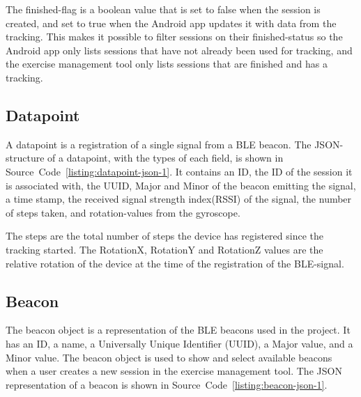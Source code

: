 \documentclass[../Main/thesis.tex]{subfiles}
\begin{document}
The finished-flag is a boolean value that is set to false when the session is created, and set to true when the Android app updates it with data from the tracking.
This makes it possible to filter sessions on their finished-status so the Android app only lists sessions that have not already been used for tracking, and the exercise management tool only lists sessions that are finished and has a tracking.

\subsection{Datapoint}
A datapoint is a registration of a single signal from a BLE beacon.
The JSON-structure of a datapoint, with the types of each field, is shown in Source~Code~\ref{listing:datapoint-json-1}.
It contains an ID, the ID of the session it is associated with, the UUID, Major and Minor of the beacon emitting the signal, a time stamp, the received signal strength index(RSSI) of the signal, the number of steps taken, and rotation-values from the gyroscope.


The steps are the total number of steps the device has registered since the tracking started. 
The RotationX, RotationY and RotationZ values are the relative rotation of the device at the time of the registration of the BLE-signal.

\subsection{Beacon}
The beacon object is a representation of the BLE beacons used in the project.
It has an ID, a name, a Universally Unique Identifier (UUID), a Major value, and a Minor value.
The beacon object is used to show and select available beacons when a user creates a new session in the exercise management tool.
The JSON representation of a beacon is shown in Source~Code~\ref{listing:beacon-json-1}.
\end{document}
